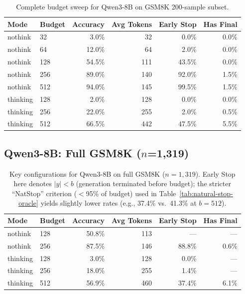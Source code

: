 \begin{table}[ht]
\centering
\small
\caption{Complete budget sweep for Qwen3-8B on GSM8K 200-sample subset.}
\label{tab:full-8b-200}
\begin{tabular}{llrrrr}
\toprule
\textbf{Mode} & \textbf{Budget} & \textbf{Accuracy} & \textbf{Avg Tokens} & \textbf{Early Stop} & \textbf{Has Final} \\
\midrule
nothink & 32 & 3.0\% & 32 & 0.0\% & 0.0\% \\
nothink & 64 & 12.0\% & 64 & 2.0\% & 0.0\% \\
nothink & 128 & 54.5\% & 111 & 43.5\% & 0.0\% \\
nothink & 256 & 89.0\% & 140 & 92.0\% & 1.5\% \\
nothink & 512 & 94.0\% & 145 & 99.5\% & 1.5\% \\
\midrule
thinking & 128 & 2.0\% & 128 & 0.0\% & 0.0\% \\
thinking & 256 & 22.0\% & 255 & 2.0\% & 0.5\% \\
thinking & 512 & 66.5\% & 442 & 47.5\% & 5.5\% \\
\bottomrule
\end{tabular}
\end{table}

\subsection{Qwen3-8B: Full GSM8K ($n$=1,319)}

\begin{table}[ht]
\centering
\small
\caption{Key configurations for Qwen3-8B on full GSM8K ($n{=}1{,}319$).
Early Stop here denotes $|y| < b$ (generation terminated before budget);
the stricter ``NatStop'' criterion ($<$95\% of budget) used in
Table~\ref{tab:natural-stop-oracle} yields slightly lower rates
(e.g., 37.4\% vs.\ 41.3\% at $b{=}512$).}
\label{tab:full-8b-1319}
\begin{tabular}{llrrrr}
\toprule
\textbf{Mode} & \textbf{Budget} & \textbf{Accuracy} & \textbf{Avg Tokens} & \textbf{Early Stop} & \textbf{Has Final} \\
\midrule
nothink & 128 & 50.8\% & 113 & --- & --- \\
nothink & 256 & 87.5\% & 146 & 88.8\% & 0.6\% \\
\midrule
thinking & 128 & 3.0\% & 128 & 0.0\% & --- \\
thinking & 256 & 18.0\% & 255 & 1.4\% & --- \\
thinking & 512 & 56.9\% & 460 & 37.4\% & 6.1\% \\
\bottomrule
\end{tabular}
\end{table}

